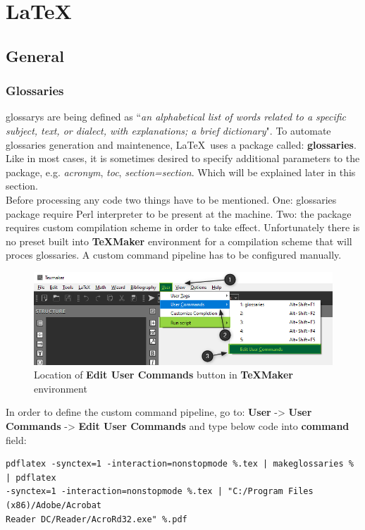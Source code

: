 \part{\LaTeX}

\chapter{General}

\section{Glossaries}

\Glspl{glossary} are being defined as ``\textit{an alphabetical list of words related to a specific subject, text, or dialect, with explanations; a brief dictionary}". To automate glossaries generation and maintenence, \LaTeX\ uses a package called: \textbf{glossaries}. Like in most cases, it is sometimes desired to specify additional parameters to the package, e.g. \textit{acronym}, \textit{toc}, \textit{section=section}. Which will be explained later in this section.\\

Before processing any code two things have to be mentioned. One: glossaries package require Perl interpreter to be present at the machine. Two: the package requires custom compilation scheme in order to take effect. Unfortunately there is no preset built into \textbf{TeXMaker} environment for a compilation scheme that will proces glossaries. A custom command \gls{pipeline} has to be configured manually.

\begin{figure}[H]
\centering
\includegraphics[scale=0.6]{content/LaTeX/figures/user_command_glossaries_marked.png}
\caption{Location of \textbf{Edit User Commands} button in \textbf{TeXMaker} environment}
\end{figure}

In order to define the custom command \gls{pipeline}, go to: \textbf{User} -> \textbf{User Commands} -> \textbf{Edit User Commands} and type below code into \textbf{command} field:
\begin{verbatim}
pdflatex -synctex=1 -interaction=nonstopmode %.tex | makeglossaries % | pdflatex 
-synctex=1 -interaction=nonstopmode %.tex | "C:/Program Files (x86)/Adobe/Acrobat
Reader DC/Reader/AcroRd32.exe" %.pdf
\end{verbatim}

